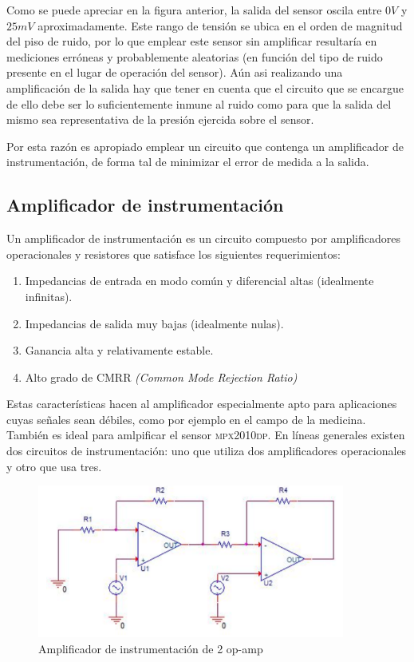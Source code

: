 Como se puede apreciar en la figura anterior, la salida del sensor oscila entre $0V$ y $25mV$ aproximadamente. Este rango de tensi\'on se ubica en el orden de magnitud del piso de ruido, por lo que emplear este sensor sin amplificar resultar\'ia en mediciones err\'oneas y probablemente aleatorias (en funci\'on del tipo de ruido presente en el lugar de operaci\'on del sensor). A\'un asi realizando una amplificaci\'on de la salida hay que tener en cuenta que el circuito que se encargue de ello debe ser lo suficientemente inmune al ruido como para que la salida del mismo sea representativa de la presi\'on ejercida sobre el sensor.


Por esta raz\'on es apropiado emplear un circuito que contenga un amplificador de instrumentaci\'on, de forma tal de minimizar el error de medida a la salida. 

\subsection{Amplificador de instrumentaci\'on}

Un amplificador de instrumentaci\'on es un circuito compuesto por amplificadores operacionales y resistores que satisface los siguientes requerimientos:

\begin{enumerate}
		\item Impedancias de entrada en modo com\'un y diferencial altas (idealmente infinitas).
		\item Impedancias de salida muy bajas (idealmente nulas).
		\item Ganancia alta y relativamente estable.
		\item Alto grado de CMRR \textit{(Common Mode Rejection Ratio)}
\end{enumerate}

Estas caracter\'isticas hacen al amplificador especialmente apto para aplicaciones cuyas se\~nales sean d\'ebiles, como por ejemplo en el campo de la medicina. Tambi\'en es ideal para amlpificar el sensor \textsc{mpx2010dp}. En l\'ineas generales existen dos circuitos de instrumentaci\'on: uno que utiliza dos amplificadores operacionales y otro que usa tres.

\begin{figure}[H]
    \centering
    \includegraphics[width=0.9\textwidth]{../EJ4/resources/instrumental_2opamp.png}
    \caption{Amplificador de instrumentaci\'on de 2 op-amp}
    \label{fig:EJ4_instrumental_2opamp}
\end{figure}


